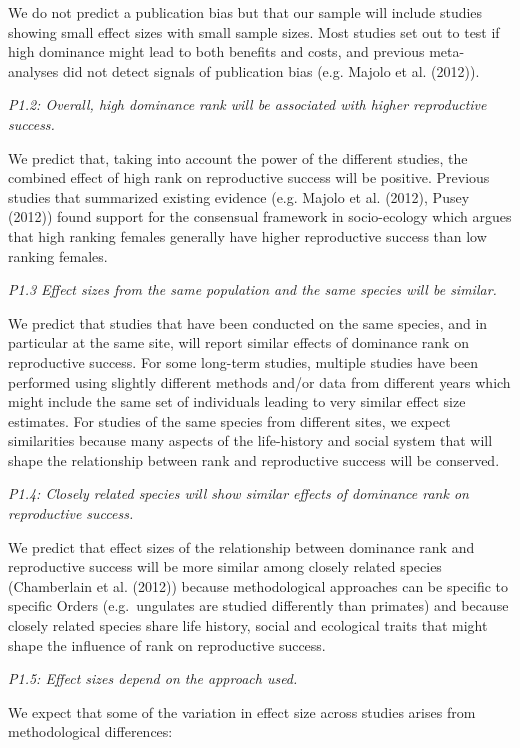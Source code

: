 \documentclass[]{article}
\begin{document}
We do not predict a publication bias but that our sample will include
studies showing small effect sizes with small sample sizes. Most studies
set out to test if high dominance might lead to both benefits and costs,
and previous meta-analyses did not detect signals of publication bias
(e.g. Majolo et al. (2012)).

\emph{P1.2: Overall, high dominance rank will be associated with higher
reproductive success.}

We predict that, taking into account the power of the different studies,
the combined effect of high rank on reproductive success will be
positive. Previous studies that summarized existing evidence (e.g.
Majolo et al. (2012), Pusey (2012)) found support for the consensual
framework in socio-ecology which argues that high ranking females
generally have higher reproductive success than low ranking females.

\emph{P1.3 Effect sizes from the same population and the same species
will be similar.}

We predict that studies that have been conducted on the same species,
and in particular at the same site, will report similar effects of
dominance rank on reproductive success. For some long-term studies,
multiple studies have been performed using slightly different methods
and/or data from different years which might include the same set of
individuals leading to very similar effect size estimates. For studies
of the same species from different sites, we expect similarities because
many aspects of the life-history and social system that will shape the
relationship between rank and reproductive success will be conserved.

\emph{P1.4: Closely related species will show similar effects of
dominance rank on reproductive success.}

We predict that effect sizes of the relationship between dominance rank
and reproductive success will be more similar among closely related
species (Chamberlain et al. (2012)) because methodological approaches
can be specific to specific Orders (e.g.~ungulates are studied
differently than primates) and because closely related species share
life history, social and ecological traits that might shape the
influence of rank on reproductive success.

\emph{P1.5: Effect sizes depend on the approach used.}

We expect that some of the variation in effect size across studies
arises from methodological differences:
\end{document}
